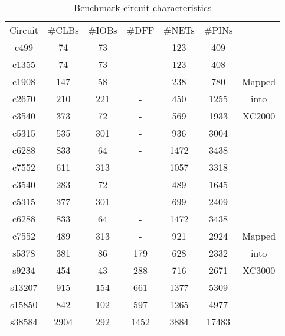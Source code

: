 \begin{table}[hpbt]
\begin{center}
\begin{tabular}{|c|c|c|c|c|c||c|}\hline
 Circuit   &\#CLBs  &\#IOBs  &\#DFF  &\#NETs  &\#PINs &\hfill  \\  \cline{1-6} \cline{1-6}
 c499      &74      &73      & -    &123     &409     &\hfill  \\ \cline{1-6}
 c1355     &74      &73      & -    &123     &408     &\hfill  \\ \cline{1-6}
 c1908     &147     &58      & -    &238     &780     &Mapped   \\ \cline{1-6}
 c2670     &210     &221     & -    &450     &1255    &into     \\ \cline{1-6}
 c3540     &373     &72      & -    &569     &1933    &XC2000   \\ \cline{1-6}
 c5315     &535     &301     & -    &936     &3004    &\hfill  \\ \cline{1-6}
 c6288     &833     &64      & -    &1472    &3438    &\hfill  \\ \cline{1-6}
 c7552     &611     &313     & -    &1057     &3318   &\hfill  \\ \hline \hline

 c3540     &283     &72      & -    &489     &1645    &\hfill  \\ \cline{1-6} 
 c5315     &377     &301     & -    &699     &2409    &\hfill \\ \cline{1-6}
 c6288     &833     &64      & -    &1472    &3438    &\hfill \\ \cline{1-6}
 c7552     &489     &313     & -    &921     &2924    &Mapped  \\ \cline{1-6}
 s5378     &381     &86      &179   &628     &2332    &into    \\ \cline{1-6}
 s9234     &454     &43      &288   &716     &2671    &XC3000  \\ \cline{1-6}
 s13207    &915     &154     &661   &1377    &5309    &\hfill  \\ \cline{1-6}
 s15850    &842     &102     &597   &1265    &4977    &\hfill    \\ \cline{1-6}
 s38584    &2904    &292     &1452  &3884    &17483   &\hfill \\ \hline
\end{tabular}
\caption{Benchmark circuit characteristics}
\label{tb:tb2}
\end{center}
\end{table}

